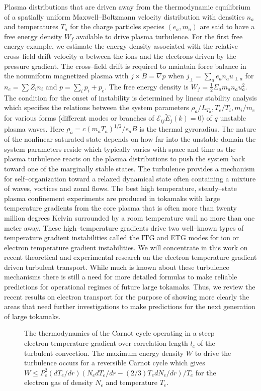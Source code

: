\documentclass[a4paper,openany,12pt]{book}
\begin{document}
Plasma distributions that are driven away from the thermodynamic equilibrium of a spatially uniform Maxwell--Boltzmann velocity distribution with densities $n_a$ and temperatures $T_a$ for the charge particles species $(e_a, m_a)$ are said to have a free energy density $W_f$ available to drive plasma turbulence. For the first free energy example, we estimate the energy density associated with the relative cross--field drift velocity $u$ between the ions and the electrons driven by the pressure gradient. The cross--field drift is required to maintain force balance in the nonuniform magnetized plasma with $j\times B=\nabla p$ when $j_\perp=\sum_ae_an_a u_{\perp a}$ for $n_e=\sum Z_in_i$ and $p=\sum_ip_i+p_e$. The free energy density is $W_f=\frac{1}{2}\Sigma_a m_a n_a u_a^2$. The condition for the onset of instability is determined by linear stability analysis which specifies the relations between the system parameters $\rho_a /L_{T_a}, T_e/T_i, m_i/m_e$ for various forms (different modes or branches of $\mathcal{E}_{ij}\widetilde E_j(k)=0$) of $q$ unstable plasma waves. Here $\rho_a =c(m_a T_a )^{1/2}/e_a B$ is the thermal gyroradius. The nature of the nonlinear saturated state depends on how far into the unstable domain the system parameters reside which typically varies with space and time as the plasma turbulence reacts on the plasma distributions to push the system back toward one of the marginally stable states. The turbulence provides a mechanism for self--organization toward a relaxed dynamical state often containing a mixture of waves, vortices and zonal flows. The best high temperature, steady--state plasma confinement experiments are produced in tokamaks with large temperature gradients from the core plasma that is often more than twenty million degrees Kelvin surrounded by a room temperature wall no more than one meter away. These high--temperature gradients drive two well--known types of temperature gradient instabilities called the ITG and ETG modes for ion or electron temperature gradient instabilities. We will concentrate in this work on recent theoretical and experimental research on the electron temperature gradient driven turbulent transport. While much is known about these turbulence mechanisms there is still a need for more detailed formulas to make reliable predictions for operational regimes of future large tokamaks. Thus, we review the recent results on electron transport for the purpose of showing more clearly the areas that need further investigations to make predictions for the next generation of large tokamaks. 
% 
\begin{figure}[H]
\centerline{}
\caption{The thermodynamics of the Carnot cycle operating in a steep electron temperature gradient over correlation length $l_c$ of the turbulent convection. The maximum energy density $W$ to drive the turbulence occurs for a reversible Carnot cycle which gives $W\le P_c^2(dT_e/dr)(N_e dT_e/dr-(2/3)T_e dN_e/dr)/T_e$ for the electron gas of density $N_e$ and temperature $T_e$.}
\label{F9.1}
\end{figure}
%
\end{document}
